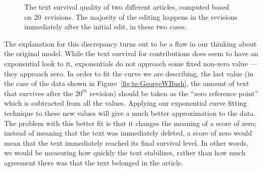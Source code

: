 \begin{figure}[tbph]
\centering
{}
\hspace{1ex}
\caption{
  The text survival quality of two different articles, computed
  based on 20~revisions.
  The majority of the editing happens in the
  revisions immediately after the initial edit, in these two cases.
  \label{fig:ts-GWB-SCBB}
}
\end{figure}

The explanation for this discrepancy turns out to be a flaw in our
thinking about the original model.
While the text survival for contributions does seem to have an
exponential look to it, exponentials do not approach some fixed
non-zero value --- they approach zero.
In order to fit the curve we are describing, the last value
(in the case of the data shown in Figure~\ref{fig:ts-GeorgeWBush},
the amount of text that survives after the $20^{th}$ revision)
should be taken as the ``zero reference point'' which is subtracted
from all the values.
Applying our exponential curve fitting technique to these new values
will give a much better approximation to the data.
The problem with this better fit is that it changes the meaning of
a score of zero; instead of meaning that the text was immediately deleted,
a score of zero would mean that the text immediately reached its
final survival level.
In other words, we would be measuring how quickly the text stabilizes,
rather than how much agreement there was that the text belonged in
the article.


